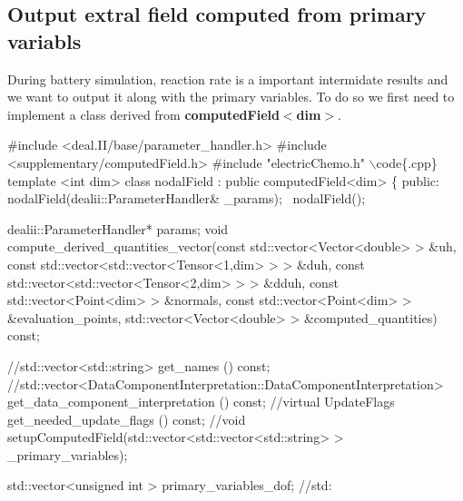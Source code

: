\hypertarget{battery_electrode_scale_computed}{}\subsection{Output extral field computed from primary variabls}\label{battery_electrode_scale_computed}
During battery simulation, reaction rate is a important intermidate results and we want to output it along with the primary variables. To do so we first need to implement a class derived from {\bfseries computed\-Field$<$dim$>$}. 
\begin{DoxyCode}
\textcolor{preprocessor}{#include <deal.II/base/parameter\_handler.h>}
\textcolor{preprocessor}{#include <supplementary/computedField.h>}
\textcolor{preprocessor}{#include "electricChemo.h"}
\(\backslash\)code\{.cpp\}
\textcolor{keyword}{template} <\textcolor{keywordtype}{int} dim>
\textcolor{keyword}{class }nodalField : \textcolor{keyword}{public} computedField<dim>
\{
\textcolor{keyword}{public}:
    nodalField(dealii::ParameterHandler& \_params);
    ~nodalField();
    
    dealii::ParameterHandler* params;
    \textcolor{keywordtype}{void} compute\_derived\_quantities\_vector(\textcolor{keyword}{const} std::vector<Vector<double> > &uh,
                           \textcolor{keyword}{const} std::vector<std::vector<Tensor<1,dim> > > &duh,
                           \textcolor{keyword}{const} std::vector<std::vector<Tensor<2,dim> > > &dduh,
                           \textcolor{keyword}{const} std::vector<Point<dim> >                  &normals,
                           \textcolor{keyword}{const} std::vector<Point<dim> >                  &evaluation\_points,
                           std::vector<Vector<double> >                    &computed\_quantities) \textcolor{keyword}{const};
                                 
    
                                 \textcolor{comment}{//std::vector<std::string> get\_names () const;}
                                 \textcolor{comment}{//std::vector<DataComponentInterpretation::DataComponentInterpretation>
       get\_data\_component\_interpretation () const;}
                                 \textcolor{comment}{//virtual UpdateFlags get\_needed\_update\_flags () const;}
                                 \textcolor{comment}{//void setupComputedField(std::vector<std::vector<std::string> >
       \_primary\_variables);}
                                                             
    std::vector<unsigned int > primary\_variables\_dof;
    \textcolor{comment}{//std:}
\end{DoxyCode}

